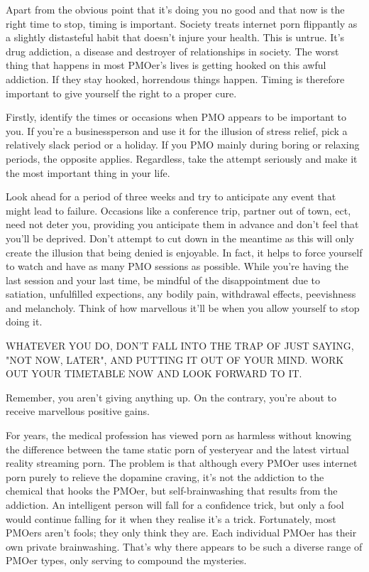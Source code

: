 \documentclass[easypeasy.tex]{subfiles}
\begin{document}
Apart from the obvious point that it's doing you no good and that now is the right time to stop, timing is important. Society treats internet porn flippantly as a slightly distasteful habit that doesn't injure your health. This is untrue. It's drug addiction, a disease and destroyer of relationships in society. The worst thing that happens in most PMOer's lives is getting hooked on this awful addiction. If they stay hooked, horrendous things happen. Timing is therefore important to give yourself the right to a proper cure.

Firstly, identify the times or occasions when PMO appears to be important to you. If you're a businessperson and use it for the illusion of stress relief, pick a relatively slack period or a holiday. If you PMO mainly during boring or relaxing periods, the opposite applies. Regardless, take the attempt seriously and make it the most important thing in your life.

Look ahead for a period of three weeks and try to anticipate any event that might lead to failure. Occasions like a conference trip, partner out of town, ect, need not deter you, providing you anticipate them in advance and don't feel that you'll be deprived. Don't attempt to cut down in the meantime as this will only create the illusion that being denied is enjoyable. In fact, it helps to force yourself to watch and have as many PMO sessions as possible. While you're having the last session and your last time, be mindful of the disappointment due to satiation, unfulfilled expections, any bodily pain, withdrawal effects, peevishness and melancholy. Think of how marvellous it'll be when you allow yourself to stop doing it.

{\large WHATEVER YOU DO, DON'T FALL INTO THE TRAP OF JUST SAYING, "NOT NOW, LATER", AND PUTTING IT OUT OF YOUR MIND. WORK OUT YOUR TIMETABLE NOW AND LOOK FORWARD TO IT.}

Remember, you aren't giving anything up. On the contrary, you're about to receive marvellous positive gains.

For years, the medical profession has viewed porn as harmless without knowing the difference between the tame static porn of yesteryear and the latest virtual reality streaming porn. The problem is that although every PMOer uses internet porn purely to relieve the dopamine craving, it's not the addiction to the chemical that hooks the PMOer, but self-brainwashing that results from the addiction. An intelligent person will fall for a confidence trick, but only a fool would continue falling for it when they realise it's a trick. Fortunately, most PMOers aren't fools; they only think they are. Each individual PMOer has their own private brainwashing. That's why there appears to be such a diverse range of PMOer types, only serving to compound the mysteries.
\end{document}
